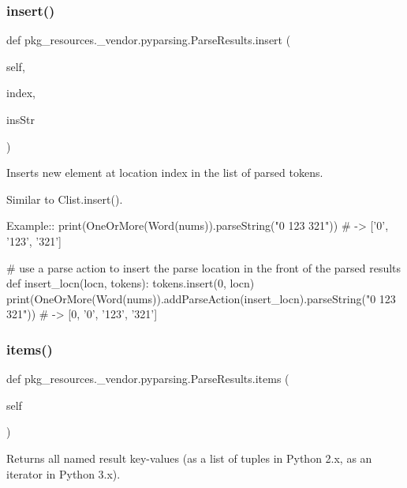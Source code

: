 \subsubsection{\texorpdfstring{insert()}{insert()}}
{\footnotesize\ttfamily def pkg\+\_\+resources.\+\_\+vendor.\+pyparsing.\+Parse\+Results.\+insert (\begin{DoxyParamCaption}\item[{}]{self,  }\item[{}]{index,  }\item[{}]{ins\+Str }\end{DoxyParamCaption})}

\begin{DoxyVerb}Inserts new element at location index in the list of parsed tokens.

Similar to C{list.insert()}.

Example::
    print(OneOrMore(Word(nums)).parseString("0 123 321")) # -> ['0', '123', '321']

    # use a parse action to insert the parse location in the front of the parsed results
    def insert_locn(locn, tokens):
tokens.insert(0, locn)
    print(OneOrMore(Word(nums)).addParseAction(insert_locn).parseString("0 123 321")) # -> [0, '0', '123', '321']
\end{DoxyVerb}
 \mbox{\label{classpkg__resources_1_1__vendor_1_1pyparsing_1_1ParseResults_aceab5058e66fab6b91ecb9c1c5044797}} 
\subsubsection{\texorpdfstring{items()}{items()}}
{\footnotesize\ttfamily def pkg\+\_\+resources.\+\_\+vendor.\+pyparsing.\+Parse\+Results.\+items (\begin{DoxyParamCaption}\item[{}]{self }\end{DoxyParamCaption})}

\begin{DoxyVerb}Returns all named result key-values (as a list of tuples in Python 2.x, as an iterator in Python 3.x).\end{DoxyVerb}
 \mbox{\label{classpkg__resources_1_1__vendor_1_1pyparsing_1_1ParseResults_adce91baa521007960c328ffa639d5974}} 
